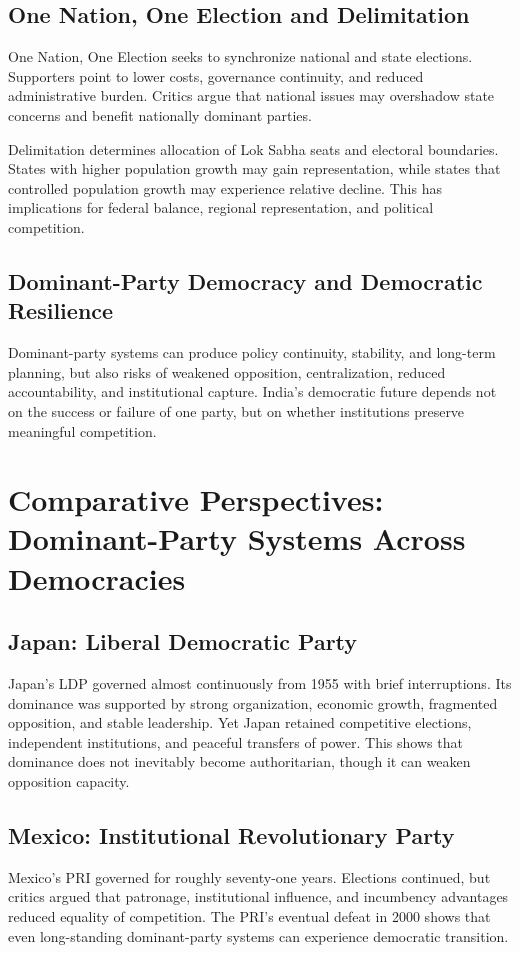 \documentclass[11pt]{article}
\begin{document}
\subsection{One Nation, One Election and Delimitation}
One Nation, One Election seeks to synchronize national and state elections. Supporters point to lower costs, governance continuity, and reduced administrative burden. Critics argue that national issues may overshadow state concerns and benefit nationally dominant parties.

Delimitation determines allocation of Lok Sabha seats and electoral boundaries. States with higher population growth may gain representation, while states that controlled population growth may experience relative decline. This has implications for federal balance, regional representation, and political competition.

\subsection{Dominant-Party Democracy and Democratic Resilience}
Dominant-party systems can produce policy continuity, stability, and long-term planning, but also risks of weakened opposition, centralization, reduced accountability, and institutional capture. India's democratic future depends not on the success or failure of one party, but on whether institutions preserve meaningful competition.

\section{Comparative Perspectives: Dominant-Party Systems Across Democracies}
\subsection{Japan: Liberal Democratic Party}
Japan's LDP governed almost continuously from 1955 with brief interruptions. Its dominance was supported by strong organization, economic growth, fragmented opposition, and stable leadership. Yet Japan retained competitive elections, independent institutions, and peaceful transfers of power. This shows that dominance does not inevitably become authoritarian, though it can weaken opposition capacity.

\subsection{Mexico: Institutional Revolutionary Party}
Mexico's PRI governed for roughly seventy-one years. Elections continued, but critics argued that patronage, institutional influence, and incumbency advantages reduced equality of competition. The PRI's eventual defeat in 2000 shows that even long-standing dominant-party systems can experience democratic transition.
\end{document}
